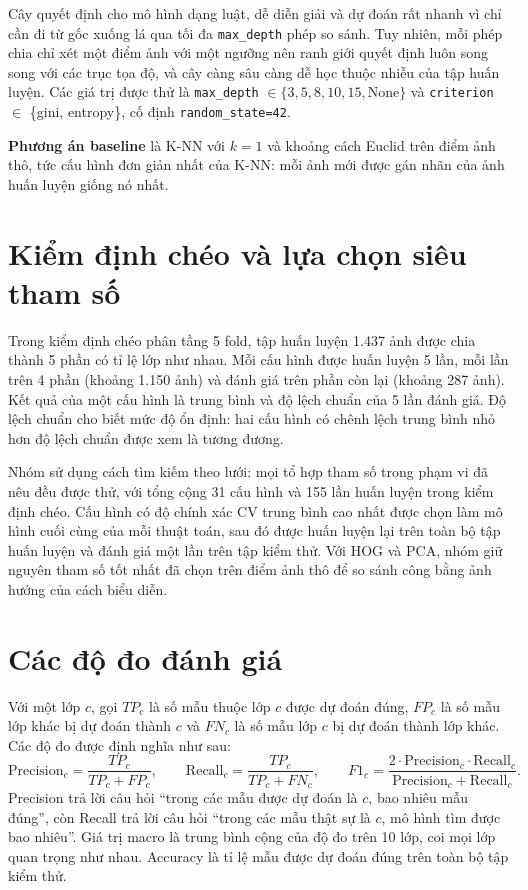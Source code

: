 \documentclass[a4paper,oneside]{report}
\begin{document}
Cây quyết định cho mô hình dạng luật, dễ diễn giải và dự đoán rất nhanh vì chỉ cần đi từ gốc xuống lá qua tối đa
\texttt{max\_depth} phép so sánh. Tuy nhiên, mỗi phép chia chỉ xét một điểm ảnh với một ngưỡng nên ranh giới quyết
định luôn song song với các trục tọa độ, và cây càng sâu càng dễ học thuộc nhiễu của tập huấn luyện. Các giá trị
được thử là \texttt{max\_depth} $\in \{3, 5, 8, 10, 15, \text{None}\}$ và \texttt{criterion} $\in$
\{gini, entropy\}, cố định \texttt{random\_state=42}.

\textbf{Phương án baseline} là K-NN với $k = 1$ và khoảng cách Euclid trên điểm ảnh thô, tức cấu hình đơn giản
nhất của K-NN: mỗi ảnh mới được gán nhãn của ảnh huấn luyện giống nó nhất.

\section{Kiểm định chéo và lựa chọn siêu tham số}

Trong kiểm định chéo phân tầng 5 fold, tập huấn luyện 1.437 ảnh được chia thành 5 phần có tỉ lệ lớp như nhau. Mỗi
cấu hình được huấn luyện 5 lần, mỗi lần trên 4 phần (khoảng 1.150 ảnh) và đánh giá trên phần còn lại (khoảng 287
ảnh). Kết quả của một cấu hình là trung bình và độ lệch chuẩn của 5 lần đánh giá. Độ lệch chuẩn cho biết mức độ ổn
định: hai cấu hình có chênh lệch trung bình nhỏ hơn độ lệch chuẩn được xem là tương đương.

Nhóm sử dụng cách tìm kiếm theo lưới: mọi tổ hợp tham số trong phạm vi đã nêu đều được thử, với tổng cộng 31 cấu
hình và 155 lần huấn luyện trong kiểm định chéo. Cấu hình có độ chính xác CV trung bình cao nhất được chọn làm mô
hình cuối cùng của mỗi thuật toán, sau đó được huấn luyện lại trên toàn bộ tập huấn luyện và đánh giá một lần trên
tập kiểm thử. Với HOG và PCA, nhóm giữ nguyên tham số tốt nhất đã chọn trên điểm ảnh thô để so sánh công bằng ảnh
hưởng của cách biểu diễn.

\section{Các độ đo đánh giá}

Với một lớp $c$, gọi $TP_c$ là số mẫu thuộc lớp $c$ được dự đoán đúng, $FP_c$ là số mẫu lớp khác bị dự đoán thành
$c$ và $FN_c$ là số mẫu lớp $c$ bị dự đoán thành lớp khác. Các độ đo được định nghĩa như sau:
\begin{equation}
\text{Precision}_c = \frac{TP_c}{TP_c + FP_c}, \qquad
\text{Recall}_c = \frac{TP_c}{TP_c + FN_c}, \qquad
F1_c = \frac{2 \cdot \text{Precision}_c \cdot \text{Recall}_c}{\text{Precision}_c + \text{Recall}_c}.
\end{equation}
Precision trả lời câu hỏi ``trong các mẫu được dự đoán là $c$, bao nhiêu mẫu đúng'', còn Recall trả lời câu hỏi
``trong các mẫu thật sự là $c$, mô hình tìm được bao nhiêu''. Giá trị macro là trung bình cộng của độ đo trên 10 lớp,
coi mọi lớp quan trọng như nhau. Accuracy là tỉ lệ mẫu được dự đoán đúng trên toàn bộ tập kiểm thử.
\end{document}
